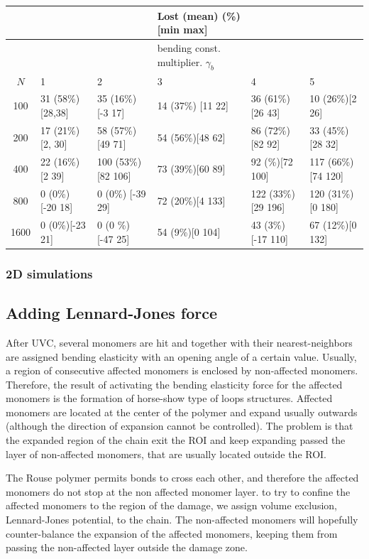 \documentclass[12pt]{report}
\begin{document}
	 
	  \begin{table}[H]
	  	\tiny{
	  		\begin{tabular}{c| l l l l l}
	  			&           & & Lost (mean) (\%)[min max]& &  \\
	  			\hline
	  			&           & & bending const. multiplier. $\gamma_b$ & &  \\
	  			\hline 
	  			$N$ 	   &            1 & 2 & 3 & 4& 5 \\   	 
	  			\hline 
	  			100 & 31 (58\%) [28,38] & 35 (16\%)[-3 17]    & 14 (37\%) [11 22] & 36 (61\%)[26 43]   & 10 (26\%)[2 26]\\
	  			200 & 17 (21\%) [2, 30] & 58 (57\%)[49 71]    & 54 (56\%)[48 62]  & 86 (72\%) [82 92]  & 33 (45\%)[28 32]\\
	  			400 & 22 (16\%) [2 39]  & 100 (53\%) [82 106] & 73 (39\%)[60 89]  & 92 (\%)[72 100]    & 117 (66\%)[74 120] \\
	  			800 &  0 (0\%) [-20 18] & 0 (0\%) [-39 29]    & 72 (20\%)[4 133]  & 122 (33\%)[29 196] & 120 (31\%)[0 180]\\
	  			1600&  0 (0\%)[-23 21]  & 0 (0 \%) [-47 25]   & 54 (9\%)[0 104]   & 43 (3\%)[-17 110]  & 67 (12\%)[0 132]\\
	  		\end{tabular}
	  	}
	  \end{table}
	\subsubsection{2D simulations}
		
	\subsection{Adding Lennard-Jones force}
      After UVC, several monomers are hit and together with their nearest-neighbors are assigned bending elasticity with an opening angle of a certain value. Usually, a region of consecutive affected monomers is enclosed by non-affected monomers. Therefore, the result of activating the bending elasticity force for the affected monomers is the formation of horse-show type of loops structures. 
      Affected monomers are located at the center of the polymer and expand usually outwards (although the direction of expansion cannot be controlled). The problem is that the expanded region of the chain exit the ROI and keep expanding passed the layer of non-affected monomers, that are usually located outside the ROI. 
      
      The Rouse polymer permits bonds to cross each other, and therefore the affected monomers do not stop at the non affected monomer layer. 
      to try to confine the affected monomers to the region of the damage, we assign volume exclusion, Lennard-Jones potential, to the chain. The non-affected monomers will hopefully counter-balance the expansion of the affected monomers, keeping them from passing the non-affected layer outside the damage zone.
      
\end{document}

